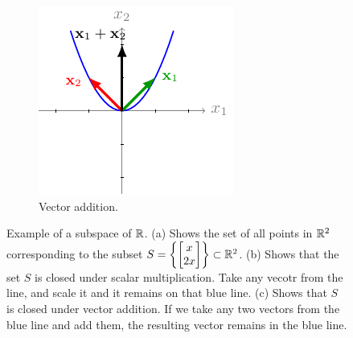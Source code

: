\begin{example}
\begin{figure}[h]
\begin{subfigure}[b]{0.32\textwidth}
            \centering
            \includegraphics{figure/chapter01/nosubspace2(c).pdf}
            \caption{Vector addition.}
            \label{fig:nosubspace2-addition}
        \end{subfigure}
        \caption{Example of a subspace of $\mathbb{R}$. (a) Shows the set of all points in $\mathbb{R}^2$ corresponding to the subset $S = \left\{ \bmxc x \\ 2 x\emx\right\} \subset \mb{R}^2$. (b) Shows that the set $S$ is closed under scalar multiplication. Take any vecotr from the line, and scale it and it remains on that blue line. (c) Shows that $S$ is closed under vector addition. If we take any two vectors from the blue line and add them, the resulting vector remains in the blue line.}
    \end{figure}
    \label{example:nosubspace-parabola}
\end{example}

